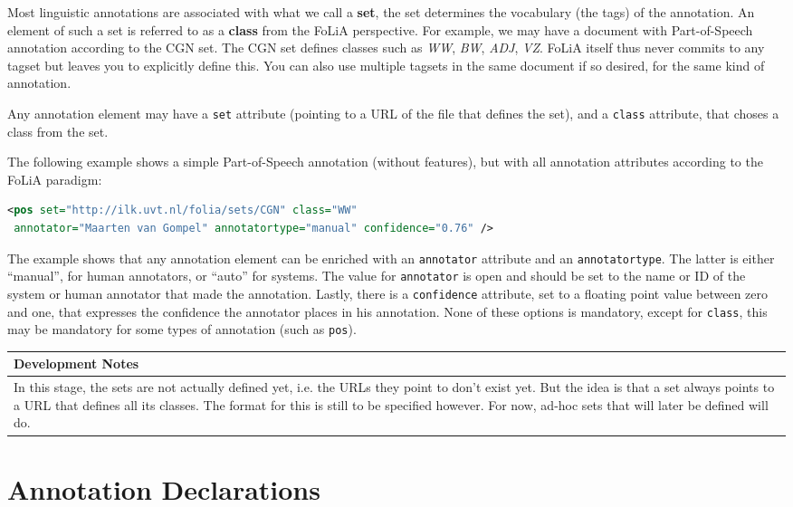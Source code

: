 \documentclass[a4paper,12pt]{report}
\newenvironment{devnotes}
{\newpage
\begin{center}
    \begin{tabular}[h!]{|p{0.8\textwidth}|}
    \hline
    {\bf Development Notes}\\\hline}
{   \\\hline
    \end{tabular}
\end{center}}
\begin{document}
Most linguistic annotations are associated with what we call a \textbf{set}, the set determines the vocabulary (the tags) of the annotation. An element of such a set is referred to as a \textbf{class} from the FoLiA perspective. For example, we may have a document with Part-of-Speech annotation according to the CGN set. The CGN set defines classes such as \emph{WW}, \emph{BW}, \emph{ADJ}, \emph{VZ}. FoLiA itself thus never commits to any tagset but leaves you to explicitly define this. You can also use multiple tagsets in the same document if so desired, for the same kind of annotation.

Any annotation element may have a \texttt{set} attribute (pointing to a URL of the file that defines the set), and a \texttt{class} attribute, that choses a class from the set.

The following example shows a simple Part-of-Speech annotation (without features), but with all annotation attributes according to the FoLiA paradigm:

\begin{lstlisting}[language=xml]
<pos set="http://ilk.uvt.nl/folia/sets/CGN" class="WW" 
 annotator="Maarten van Gompel" annotatortype="manual" confidence="0.76" />
\end{lstlisting}

The example shows that any annotation element can be enriched with an \texttt{annotator} attribute and an \texttt{annotatortype}. The latter is either ``manual'', for human annotators, or ``auto'' for systems.  The value for \texttt{annotator} is open and should be set to the name or ID of the system or human annotator that made the annotation. Lastly, there is a \texttt{confidence} attribute, set to a floating point value between zero and one, that expresses the confidence the annotator places in his annotation. None of these options is mandatory, except for \texttt{class}, this may be mandatory for some types of annotation (such as \texttt{pos}).

\begin{devnotes}
In this stage, the sets are not actually defined yet, i.e. the URLs they point to don't exist yet. But the idea is that a set always points to a URL that defines all its classes. The format for this is still to be specified however. For now, ad-hoc sets that will later be defined will do.
\end{devnotes}


\section{Annotation Declarations}
\end{document}
